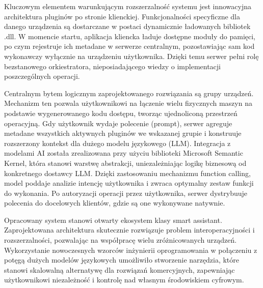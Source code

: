 Kluczowym elementem warunkującym rozszerzalność systemu jest innowacyjna architektura pluginów po stronie klienckiej. Funkcjonalności specyficzne dla danego urządzenia są dostarczane w postaci dynamicznie ładowanych bibliotek .dll. W momencie startu, aplikacja kliencka ładuje dostępne moduły do pamięci, po czym rejestruje ich metadane w serwerze centralnym, pozostawiając sam kod wykonawczy wyłącznie na urządzeniu użytkownika. Dzięki temu serwer pełni rolę bezstanowego orkiestratora, nieposiadającego wiedzy o implementacji poszczególnych operacji.

Centralnym bytem logicznym zaprojektowanego rozwiązania są grupy urządzeń. Mechanizm ten pozwala użytkownikowi na łączenie wielu fizycznych maszyn na podstawie wygenerowanego kodu dostępu, tworząc ujednoliconą przestrzeń operacyjną. Gdy użytkownik wydaje polecenie (prompt), serwer agreguje metadane wszystkich aktywnych pluginów we wskazanej grupie i konstruuje rozszerzony kontekst dla dużego modelu językowego (LLM). Integracja z modelami AI została zrealizowana przy użyciu biblioteki Microsoft Semantic Kernel, która stanowi warstwę abstrakcji, uniezależniając logikę biznesową od konkretnego dostawcy LLM. Dzięki zastosowaniu mechanizmu function calling, model poddaje analizie intencję użytkownika i zwraca optymalny zestaw funkcji do wykonania. Po autoryzacji operacji przez użytkownika, serwer dystrybuuje polecenia do docelowych klientów, gdzie są one wykonywane natywnie.

Opracowany system stanowi otwarty ekosystem klasy smart assistant. Zaprojektowana architektura skutecznie rozwiązuje problem interoperacyjności i rozszerzalności, pozwalając na współpracę wielu zróżnicowanych urządzeń. Wykorzystanie nowoczesnych wzorców inżynierii oprogramowania w połączeniu z potęgą dużych modelów językowych umożliwiło stworzenie narzędzia, które stanowi skalowalną alternatywę dla rozwiązań komercyjnych, zapewniając użytkownikowi niezależność i kontrolę nad własnym środowiskiem cyfrowym.
